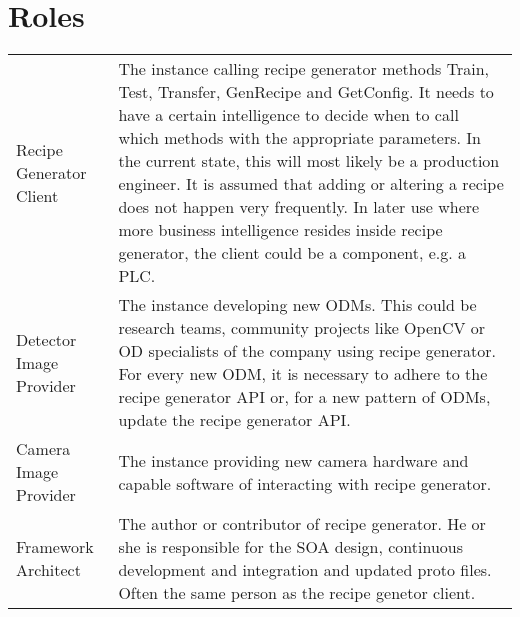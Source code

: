 
\appendix

\chapter{Roles}
\label{sec:involvedparties}
\extrarowsep=0.6cm\begin{longtabu} to \linewidth{lX}
    Recipe Generator Client & The instance calling recipe generator methods Train, Test, Transfer, GenRecipe and GetConfig. It needs to have a certain intelligence to decide when to call which methods with the appropriate parameters. In the current state, this will most likely be a production engineer. It is assumed that adding or altering a recipe does not happen very frequently. In later use where more business intelligence resides inside recipe generator, the client could be a component, e.g. a PLC.\\ 
    Detector Image Provider & The instance developing new ODMs. This could be research teams, community projects like OpenCV or OD specialists of the company using recipe generator. For every new ODM, it is necessary to adhere to the recipe generator API or, for a new pattern of ODMs, update the recipe generator API.\\
    Camera Image Provider &  	The instance providing new camera hardware and capable software of interacting with recipe generator.\\ 
    Framework Architect & The author or contributor of recipe generator. He or she is responsible for the SOA design, continuous development and integration and updated proto files. Often the same person as the recipe genetor client.
\end{longtabu}


